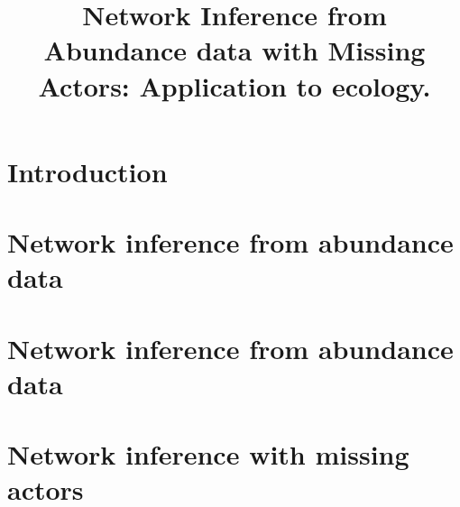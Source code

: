 \documentclass[11pt,a4paper]{book}
\title{Network Inference from Abundance data with Missing Actors: Application to ecology.}
\begin{document}
\maketitle
\tableofcontents
\chapter*{Introduction}


\chapter{Network inference from abundance data}

	
	
\chapter{Network inference from abundance data}

	
\chapter{Network inference with missing actors}

\end{document}
